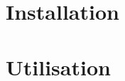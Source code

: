 \documentclass[a4paper, french]{report}
\begin{document}
\newpage
\pagestyle{empty}
\tableofcontents
{}
\pagestyle{plain}

\newpage




\part{Installation}


\part{Utilisation}

\end{document}
